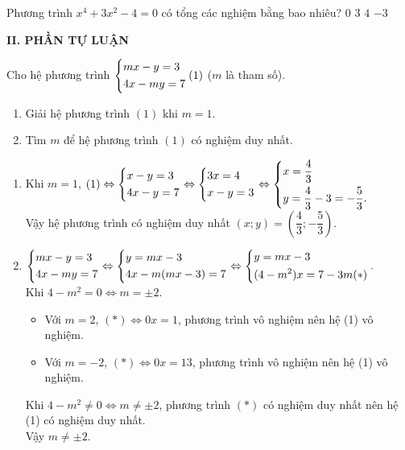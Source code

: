 \begin{ex}%
	Phương trình $x^4+3x^2-4=0$ có tổng các nghiệm bằng bao nhiêu?
	\choice
	{\True $0$}
	{$3$}
	{$4$}
	{$-3$}
\end{ex}
\noindent\textbf{II. PHẦN TỰ LUẬN}
\setcounter{ex}{0}
\begin{ex}%
    Cho hệ phương trình $\left\{\begin{aligned}&mx-y=3\\&4x-my=7\end{aligned}\right. (1)$ ($m$ là tham số).   
    \begin{enumerate}
        \item Giải hệ phương trình $(1)$ khi $m=1$.
        \item Tìm $m$ để hệ phương trình $(1)$ có nghiệm duy nhất.
    \end{enumerate}
\loigiai
    {
    \begin{enumerate}
        \item Khi $m=1$, $(1) \Leftrightarrow \left\{\begin{aligned}&x-y=3\\&4x-y=7\end{aligned}\right. \Leftrightarrow \left\{\begin{aligned}&3x=4\\&x-y=3\end{aligned}\right. \Leftrightarrow \left\{\begin{aligned}&x=\dfrac{4}{3}\\&y=\dfrac{4}{3}-3=-\dfrac{5}{3}.\end{aligned}\right.$\\
        Vậy hệ phương trình có nghiệm duy nhất $(x; y)=\left(\dfrac{4}{3}; -\dfrac{5}{3}\right)$.
        \item  $\left\{\begin{aligned}&mx-y=3\\&4x-my=7\end{aligned}\right. \Leftrightarrow \left\{\begin{aligned}&y=mx-3\\&4x-m(mx-3)=7\end{aligned}\right. \Leftrightarrow \left\{\begin{aligned}&y=mx-3\\&(4-m^2)x=7-3m (\ast)\end{aligned}\right..$\\
        Khi $4-m^2=0 \Leftrightarrow m=\pm 2.$
        \begin{itemize}
        	\item Với $m=2$, $(\ast) \Leftrightarrow 0x=1$, phương trình vô nghiệm nên hệ (1) vô nghiệm.
        	\item Với $m=-2$, $(\ast) \Leftrightarrow 0x=13$, phương trình vô nghiệm nên hệ (1) vô nghiệm.
        \end{itemize}
      Khi $4-m^2\neq 0 \Leftrightarrow m \neq \pm 2$, phương trình $(\ast)$ có nghiệm duy nhất nên hệ (1) có nghiệm duy nhất.\\
      Vậy $m \neq \pm 2$.
    \end{enumerate}
    }
\end{ex}

